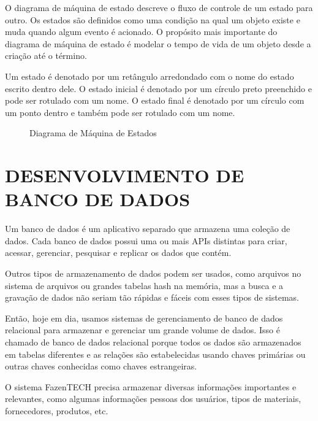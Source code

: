 O diagrama de máquina de estado descreve o fluxo de controle de um estado para outro. Os estados são definidos como uma condição na qual um objeto existe e muda quando algum evento é acionado. O propósito mais importante do diagrama de máquina de estado é modelar o tempo de vida de um objeto desde a criação até o término.

Um estado é denotado por um retângulo arredondado com o nome do estado escrito dentro dele. O estado inicial é denotado por um círculo preto preenchido e pode ser rotulado com um nome. O estado final é denotado por um círculo com um ponto dentro e também pode ser rotulado com um nome.

\begin{figure}[!htb]
    \centering
    \begin{minipage}{\wd0}
        \caption{Diagrama de Máquina de Estados}
        \label{fig:figura4}
    \end{minipage}
\end{figure}

\section{DESENVOLVIMENTO DE BANCO DE DADOS}

Um banco de dados é um aplicativo separado que armazena uma coleção de dados. Cada banco de dados possui uma ou mais APIs distintas para criar, acessar, gerenciar, pesquisar e replicar os dados que contém.

Outros tipos de armazenamento de dados podem ser usados, como arquivos no sistema de arquivos ou grandes tabelas hash na memória, mas a busca e a gravação de dados não seriam tão rápidas e fáceis com esses tipos de sistemas.

Então, hoje em dia, usamos sistemas de gerenciamento de banco de dados relacional para armazenar e gerenciar um grande volume de dados. Isso é chamado de banco de dados relacional porque todos os dados são armazenados em tabelas diferentes e as relações são estabelecidas usando chaves primárias ou outras chaves conhecidas como chaves estrangeiras.

O sistema FazenTECH precisa armazenar diversas informações importantes e relevantes, como algumas informações pessoas dos usuários, tipos de materiais, fornecedores, produtos, etc.

